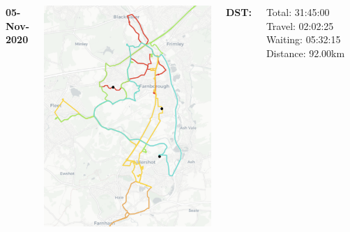 \documentclass[usenames,dvipsnames]{beamer}
\begin{document}
\begin{frame}
\begin{columns}
\begin{minipage}[c][0.05\textheight][c]{\linewidth}
			\textbf{05-Nov-2020}
		\end{minipage}
		\begin{minipage}[c][0.7\textheight][c]{\linewidth}
			\centering
			\includegraphics[width=0.8\linewidth]{figures/05AldershotDST2}
		\end{minipage}
		\begin{minipage}[c][0.2\textheight][c]{\linewidth}
			\scriptsize
			\hspace{17mm}\textbf{DST:}
			\begin{itemize}
				\setlength{\itemindent}{0.5in}
				\ditem Total: 31:45:00
				\ditem Travel: 02:02:25
				\ditem Waiting: 05:32:15
				\ditem Distance: 92.00km
			\end{itemize}
		\end{minipage}
	\end{columns}
\end{frame}
\end{document}
